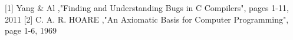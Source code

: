 %

%




\begin{thebibliography}{}
%
%
[1] Yang & Al ,"Finding and Understanding Bugs in C Compilers", pages 1-11, 2011\break
{} 
[2] C. A. R. HOARE ,"An Axiomatic Basis for Computer Programming", page 1-6, 1969
\end{thebibliography}



